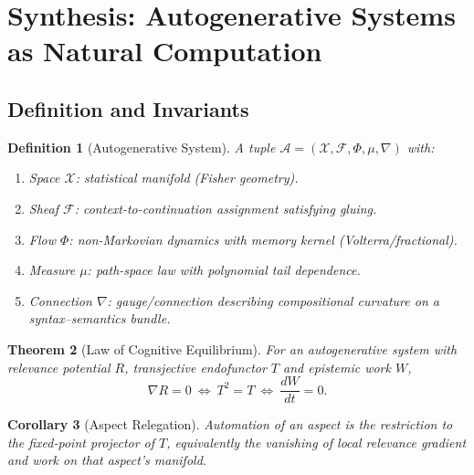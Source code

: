 \documentclass[12pt,a4paper,twoside,openright]{book}
\newtheorem{theorem}{Theorem}
\newtheorem{definition}[theorem]{Definition}
\newtheorem{corollary}[theorem]{Corollary}
\begin{document}
\section{Synthesis: Autogenerative Systems as Natural Computation}
\subsection{Definition and Invariants}
\begin{definition}[Autogenerative System]
A tuple $\mathcal{A}=(\mathcal{X},\mathcal{F},\Phi,\mu,\nabla)$ with:
\begin{enumerate}[leftmargin=1.2em]
\item \emph{Space} $\mathcal{X}$: statistical manifold (Fisher geometry).
\item \emph{Sheaf} $\mathcal{F}$: context-to-continuation assignment satisfying gluing.
\item \emph{Flow} $\Phi$: non-Markovian dynamics with memory kernel (Volterra/fractional).
\item \emph{Measure} $\mu$: path-space law with polynomial tail dependence.
\item \emph{Connection} $\nabla$: gauge/connection describing compositional curvature on a syntax–semantics bundle.
\end{enumerate}
\end{definition}

\begin{theorem}[Law of Cognitive Equilibrium]
For an autogenerative system with relevance potential $R$, transjective endofunctor $T$ and epistemic work $W$,
\[
\nabla R=0 \ \Longleftrightarrow\ T^2=T \ \Longleftrightarrow\ \frac{dW}{dt}=0.
\]
\end{theorem}

\begin{corollary}[Aspect Relegation]
Automation of an aspect is the restriction to the fixed-point projector of $T$, equivalently the vanishing of local relevance gradient and work on that aspect’s manifold.
\end{corollary}
\end{document}
